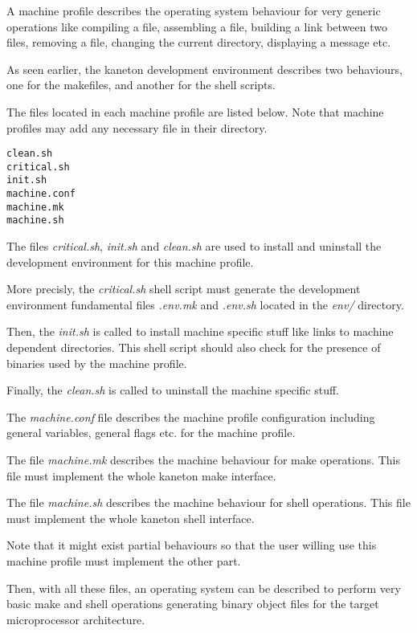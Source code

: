 A machine profile describes the operating system behaviour for very
generic operations like compiling a file, assembling a file, building
a link between two files, removing a file, changing the current directory,
displaying a message etc.

As seen earlier, the kaneton development environment describes two
behaviours, one for the makefiles, and another for the shell scripts.

The files located in each machine profile are listed below. Note that
machine profiles may add any necessary file in their directory.

\begin{verbatim}
clean.sh
critical.sh
init.sh
machine.conf
machine.mk
machine.sh
\end{verbatim}

The files \textit{critical.sh}, \textit{init.sh} and \textit{clean.sh} are
used to install and uninstall the development environment for this
machine profile.

More precisly, the \textit{critical.sh} shell script must generate
the development environment fundamental files \textit{.env.mk} and
\textit{.env.sh} located in the \textit{env/} directory.

Then, the \textit{init.sh} is called to install machine specific stuff
like links to machine dependent directories. This shell script should also
check for the presence of binaries used by the machine profile.

Finally, the \textit{clean.sh} is called to uninstall the machine
specific stuff.

The \textit{machine.conf} file describes the machine profile configuration
including general variables, general flags etc. for the machine profile.

The file \textit{machine.mk} describes the machine behaviour for
make operations. This file must implement the whole kaneton make interface.

The file \textit{machine.sh} describes the machine behaviour for
shell operations. This file must implement the whole kaneton shell
interface.

Note that it might exist partial behaviours so that the user willing use
this machine profile must implement the other part.

Then, with all these files, an operating system can be described to
perform very basic make and shell operations generating binary object
files for the target microprocessor architecture.

